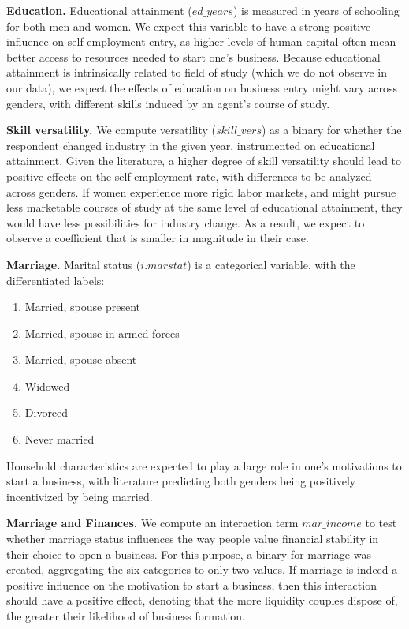 \textbf{Education.} Educational attainment ($ed\_years$) is measured in years of schooling for both men and women. We expect this variable to have a strong positive influence on self-employment entry, as higher levels of human capital often mean better access to resources needed to start one's business. Because educational attainment is intrinsically related to field of study (which we do not observe in our data), we expect the effects of education on business entry might vary across genders, with different skills induced by an agent's course of study.

\textbf{Skill versatility.} We compute versatility ($skill\_vers$) as a binary for whether the respondent changed industry in the given year, instrumented on educational attainment. Given the literature, a higher degree of skill versatility should lead to positive effects on the self-employment rate, with differences to be analyzed across genders. If women experience more rigid labor markets, and might pursue less marketable courses of study at the same level of educational attainment, they would have less possibilities for industry change. As a result, we expect to observe a coefficient that is smaller in magnitude in their case. 

\textbf{Marriage.}  Marital status ($i.marstat$) is a categorical variable, with the differentiated labels:
\begin{enumerate}
\singlespacing
\item Married, spouse present
\item Married, spouse in armed forces
\item Married, spouse absent
\item Widowed
\item Divorced
\item Never married
\end{enumerate}

Household characteristics are expected to play a large role in one's motivations to start a business, with literature predicting both genders being positively incentivized by being married. 

\textbf{Marriage and Finances.} We compute an interaction term $mar\_income$ to test whether marriage status influences the way people value financial stability in their choice to open a business. For this purpose, a binary for marriage was created, aggregating the six categories to only two values. If marriage is indeed a positive influence on the motivation to start a business, then this interaction should have a positive effect, denoting that the more liquidity couples dispose of, the greater their likelihood of business formation. 

